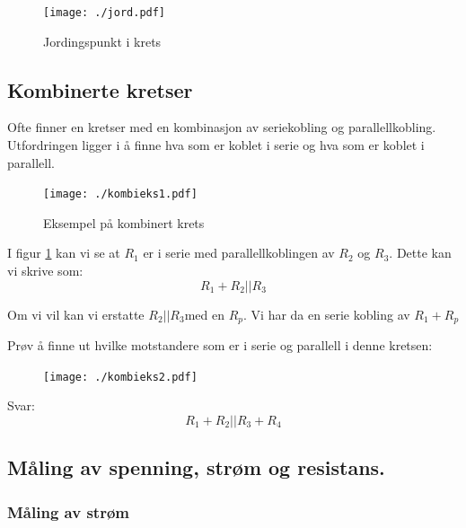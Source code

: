 \documentclass[12pt,a4paper]{article}
\begin{document}
\begin{figure}[H]
\noindent \begin{centering}
\texttt{[image: ./jord.pdf]}
\par\end{centering}
\caption{Jordingspunkt i krets}
\end{figure}


\subsection{Kombinerte kretser}

Ofte finner en kretser med en kombinasjon av seriekobling og parallellkobling.
Utfordringen ligger i å finne hva som er koblet i serie og hva som
er koblet i parallell. 

\begin{figure}
\noindent \begin{centering}
\texttt{[image: ./kombieks1.pdf]}
\par\end{centering}
\caption{\label{fig:Eksempel-p=0000E5-kombinert}Eksempel på kombinert krets}
\end{figure}

I figur \ref{fig:Eksempel-p=0000E5-kombinert} kan vi se at $R_{1}$
er i serie med parallellkoblingen av $R_{2}$ og $R_{3}$. Dette kan
vi skrive som:
\[
R_{1}+R_{2}||R_{3}
\]

Om vi vil kan vi erstatte $R_{2}||R_{3}$med en $R_{p}$. Vi har da
en serie kobling av $R_{1}+R_{p}$ 

Prøv å finne ut hvilke motstandere som er i serie og parallell i denne
kretsen:

\begin{figure}
\noindent \begin{centering}
\texttt{[image: ./kombieks2.pdf]}
\par\end{centering}
\noindent \centering{}\caption{}
\end{figure}

Svar:
\[
R_{1}+R_{2}||R_{3}+R_{4}
\]
 
\subsection{Måling av spenning, strøm og resistans. }

\subsubsection{Måling av strøm}
\end{document}

